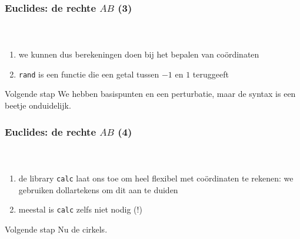 \documentclass[]{beamer}
\begin{document}
\begin{frame}
  \frametitle{Euclides: de rechte $AB$ (3)}

  \begin{columns}
    \begin{column}{.67\textwidth}
      \inputminted[fontsize = \scriptsize]{latex}{tikz/triangle/1c.tikz}
    \end{column}
    \begin{column}{.33\textwidth}
      
    \end{column}
  \end{columns}

  \small
  \begin{enumerate}
    \item\pause we kunnen dus berekeningen doen bij het bepalen van co\"ordinaten
    \item\pause \texttt{rand} is een functie die een getal tussen $-1$ en $1$ teruggeeft
  \end{enumerate}
  \pause
  \begin{block}{Volgende stap}
    We hebben basispunten en een perturbatie, maar de syntax is een beetje onduidelijk.
  \end{block}
\end{frame}

\begin{frame}
  \frametitle{Euclides: de rechte $AB$ (4)}

  \begin{columns}
    \begin{column}{.67\textwidth}
      \inputminted[fontsize = \scriptsize]{latex}{tikz/triangle/1d.tikz}
    \end{column}
    \begin{column}{.33\textwidth}
      
    \end{column}
  \end{columns}

  \small
  \begin{enumerate}
    \item\pause de library \texttt{calc} laat ons toe om heel flexibel met co\"ordinaten te rekenen: we gebruiken dollartekens om dit aan te duiden
    \item\pause meestal is \texttt{calc} zelfs niet nodig (!)
  \end{enumerate}
  \pause
  \begin{block}{Volgende stap}
    Nu de cirkels.
  \end{block}
\end{frame}
\end{document}
